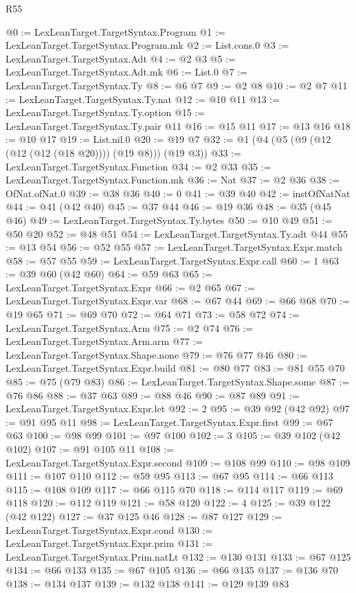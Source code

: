 \begin{lexlean}{R55}
\begin{coremodule}
{{{{{{{{{{{{{{{{{{{{{{{{{{{{{{{{{{{{{{{{{{{{{{{{{{{{{{{{{{{{{{{{{{{{{{{{{{{{{{{{@0 := LexLeanTarget.TargetSyntax.Program
@1 := LexLeanTarget.TargetSyntax.Program.mk
@2 := List.cons.{0}
@3 := LexLeanTarget.TargetSyntax.Adt
@4 := @2 @3
@5 := LexLeanTarget.TargetSyntax.Adt.mk
@6 := List.{0}
@7 := LexLeanTarget.TargetSyntax.Ty
@8 := @6 @7
@9 := @2 @8
@10 := @2 @7
@11 := LexLeanTarget.TargetSyntax.Ty.nat
@12 := @10 @11
@13 := LexLeanTarget.TargetSyntax.Ty.option
@15 := LexLeanTarget.TargetSyntax.Ty.pair @11
@16 := @15 @11
@17 := @13 @16
@18 := @10 @17
@19 := List.nil.{0}
@20 := @19 @7
@32 := @1 (@4 (@5 (@9 (@12 (@12 (@12 (@18 @20)))) (@19 @8))) (@19 @3))
@33 := LexLeanTarget.TargetSyntax.Function
@34 := @2 @33
@35 := LexLeanTarget.TargetSyntax.Function.mk
@36 := Nat
@37 := @2 @36
@38 := OfNat.ofNat.{0}
@39 := @38 @36
@40 := 0
@41 := @39 @40
@42 := instOfNatNat
@44 := @41 (@42 @40)
@45 := @37 @44
@46 := @19 @36
@48 := @35 (@45 @46)
@49 := LexLeanTarget.TargetSyntax.Ty.bytes
@50 := @10 @49
@51 := @50 @20
@52 := @48 @51
@54 := LexLeanTarget.TargetSyntax.Ty.adt @44
@55 := @13 @54
@56 := @52 @55
@57 := LexLeanTarget.TargetSyntax.Expr.match
@58 := @57 @55
@59 := LexLeanTarget.TargetSyntax.Expr.call
@60 := 1
@63 := @39 @60 (@42 @60)
@64 := @59 @63
@65 := LexLeanTarget.TargetSyntax.Expr
@66 := @2 @65
@67 := LexLeanTarget.TargetSyntax.Expr.var
@68 := @67 @44
@69 := @66 @68
@70 := @19 @65
@71 := @69 @70
@72 := @64 @71
@73 := @58 @72
@74 := LexLeanTarget.TargetSyntax.Arm
@75 := @2 @74
@76 := LexLeanTarget.TargetSyntax.Arm.arm
@77 := LexLeanTarget.TargetSyntax.Shape.none
@79 := @76 @77 @46
@80 := LexLeanTarget.TargetSyntax.Expr.build
@81 := @80 @77
@83 := @81 @55 @70
@85 := @75 (@79 @83)
@86 := LexLeanTarget.TargetSyntax.Shape.some
@87 := @76 @86
@88 := @37 @63
@89 := @88 @46
@90 := @87 @89
@91 := LexLeanTarget.TargetSyntax.Expr.let
@92 := 2
@95 := @39 @92 (@42 @92)
@97 := @91 @95 @11
@98 := LexLeanTarget.TargetSyntax.Expr.first
@99 := @67 @63
@100 := @98 @99
@101 := @97 @100
@102 := 3
@105 := @39 @102 (@42 @102)
@107 := @91 @105 @11
@108 := LexLeanTarget.TargetSyntax.Expr.second
@109 := @108 @99
@110 := @98 @109
@111 := @107 @110
@112 := @59 @95
@113 := @67 @95
@114 := @66 @113
@115 := @108 @109
@117 := @66 @115 @70
@118 := @114 @117
@119 := @69 @118
@120 := @112 @119
@121 := @58 @120
@122 := 4
@125 := @39 @122 (@42 @122)
@127 := @37 @125 @46
@128 := @87 @127
@129 := LexLeanTarget.TargetSyntax.Expr.cond
@130 := LexLeanTarget.TargetSyntax.Expr.prim
@131 := LexLeanTarget.TargetSyntax.Prim.natLt
@132 := @130 @131
@133 := @67 @125
@134 := @66 @133
@135 := @67 @105
@136 := @66 @135
@137 := @136 @70
@138 := @134 @137
@139 := @132 @138
@141 := @129 @139 @83
}}}}}}}}}}}}}}}}}}}}}}}}}}}}}}}}}}}}}}}}}}}}}}}}}}}}}}}}}}}}}}}}}}}}}}}}}}}}}}}}
\end{coremodule}
\end{lexlean}

